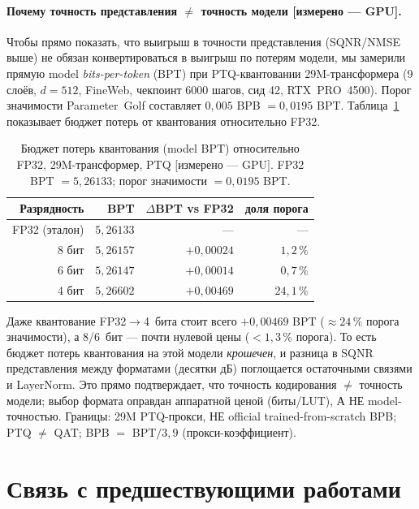 \documentclass[11pt,a4paper]{article}
\theoremstyle{plain}
\begin{document}
\paragraph{Почему точность представления \(\ne\) точность модели
[измерено --- GPU].}
Чтобы прямо показать, что выигрыш в точности представления
(SQNR/NMSE выше) не обязан конвертироваться в выигрыш по потерям
модели, мы замерили прямую model \emph{bits-per-token} (BPT) при
PTQ-квантовании 29M-трансформера (9 слоёв, \(d=512\), FineWeb,
чекпоинт 6000 шагов, сид 42, RTX~PRO~4500). Порог значимости
Parameter~Golf составляет \(0{,}005\) BPB \(= 0{,}0195\) BPT.
Таблица~\ref{tab:bpt} показывает бюджет потерь от квантования
относительно FP32.

\begin{table}[t]
\centering
\caption{Бюджет потерь квантования (model BPT) относительно FP32,
29M-трансформер, PTQ \(\text{[измерено --- GPU]}\). FP32 BPT \(= 5{,}26133\);
порог значимости \(= 0{,}0195\) BPT.}
\label{tab:bpt}
\small
\begin{tabular}{@{}r r r r@{}}
\toprule
Разрядность & BPT & \(\Delta\)BPT vs FP32 & доля порога \\
\midrule
FP32 (эталон) & \(5{,}26133\) & --- & --- \\
8 бит & \(5{,}26157\) & \(+0{,}00024\) & \(1{,}2\,\%\) \\
6 бит & \(5{,}26147\) & \(+0{,}00014\) & \(0{,}7\,\%\) \\
4 бит & \(5{,}26602\) & \(+0{,}00469\) & \(24{,}1\,\%\) \\
\bottomrule
\end{tabular}
\end{table}

Даже квантование FP32\(\to\)4~бита стоит всего
\(+0{,}00469\) BPT (\(\approx 24\,\%\) порога значимости), а 8/6~бит ---
почти нулевой цены (\(< 1{,}3\,\%\) порога). То есть бюджет
потерь квантования на этой модели \emph{крошечен}, и разница в
SQNR представления между форматами (десятки дБ) поглощается
остаточными связями и LayerNorm. Это прямо подтверждает, что
точность кодирования \(\ne\) точность модели; выбор формата
оправдан аппаратной ценой (биты/LUT), А НЕ model-точностью.
Границы: 29M PTQ-прокси, НЕ official trained-from-scratch BPB;
PTQ \(\ne\) QAT; BPB \(=\) BPT\(/3{,}9\) (прокси-коэффициент).

\section{Связь с предшествующими работами}\label{sec:prior}
\end{document}
